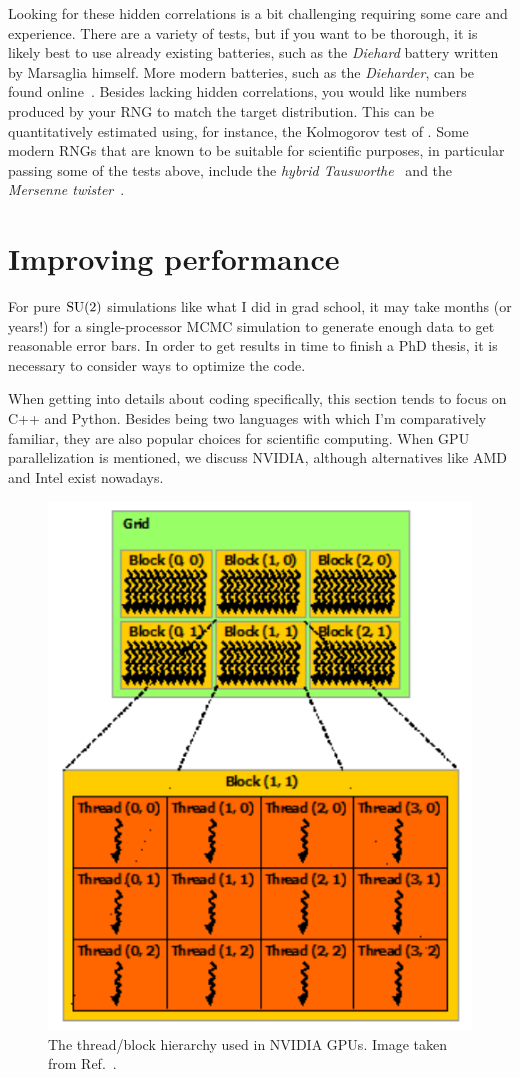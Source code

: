 Looking for these hidden correlations is a bit challenging requiring some care
and experience. There are a variety of tests, but if you want to be thorough,
it is likely best to use already existing batteries, such as the {\it Diehard}
battery written by Marsaglia himself. More modern batteries, 
such as the {\it Dieharder}, can be found online~\cite{dieharder}.
Besides lacking hidden correlations, you would like numbers produced by your
RNG to match the target distribution. This can be quantitatively estimated
using, for instance, the Kolmogorov test of .
Some modern RNGs that are known to be suitable for scientific purposes,
in particular passing some of the tests above, include
the 
{\it hybrid Tausworthe}~\cite{tausworthe_random_1965,lecuyer_maximally_1996}
and 
the {\it Mersenne twister}~\cite{matsumoto_mersenne_1998}.

\section{Improving performance}\label{sec:performance}

For pure $\operatorname{SU}(2)$ simulations like what I did in grad school, 
it may take months (or years!) for a single-processor MCMC simulation to
generate enough data to get reasonable error bars. In order to get
results in time to finish a PhD thesis, it is necessary to consider ways to
optimize the code.

When getting into details about coding specifically, this section tends to focus
on C++ and Python. Besides being two languages with which I'm comparatively
familiar, they are also popular choices for scientific computing. When GPU
parallelization is mentioned, we discuss NVIDIA, although alternatives like AMD
and Intel exist nowadays.

\begin{figure}
\centering
\includegraphics[width=0.4\linewidth]{figs/threadBlock.pdf}
\caption{The thread/block hierarchy used in NVIDIA GPUs.
Image taken from Ref.~\cite{NVIDIA}.}
\label{fig:threadBlock}
\end{figure}

